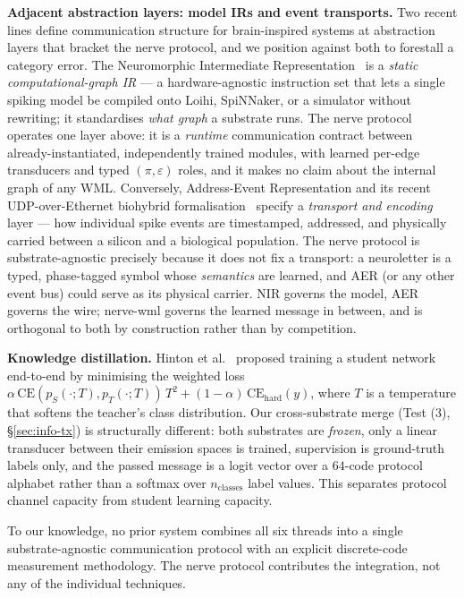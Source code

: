 \documentclass[10pt,twocolumn]{article}
\begin{document}
\textbf{Adjacent abstraction layers: model IRs and event transports.}
Two recent lines define communication structure for brain-inspired
systems at abstraction layers that bracket the nerve protocol, and we
position against both to forestall a category error. The Neuromorphic
Intermediate Representation~\cite{pedersen2024nir} is a
\emph{static computational-graph IR} --- a hardware-agnostic instruction
set that lets a single spiking model be compiled onto Loihi, SpiNNaker,
or a simulator without rewriting; it standardises \emph{what graph} a
substrate runs. The nerve protocol operates one layer above: it is a
\emph{runtime} communication contract between already-instantiated,
independently trained modules, with learned per-edge transducers and
typed $(\pi, \varepsilon)$ roles, and it makes no claim about the
internal graph of any WML. Conversely, Address-Event Representation and
its recent UDP-over-Ethernet biohybrid formalisation~\cite{aer2025biohybrid}
specify a \emph{transport and encoding} layer --- how individual spike
events are timestamped, addressed, and physically carried between a
silicon and a biological population. The nerve protocol is
substrate-agnostic precisely because it does not fix a transport: a
neuroletter is a typed, phase-tagged symbol whose \emph{semantics} are
learned, and AER (or any other event bus) could serve as its physical
carrier. NIR governs the model, AER governs the wire; nerve-wml
governs the learned message in between, and is orthogonal to both by
construction rather than by competition.

\textbf{Knowledge distillation.} Hinton et al.~\cite{hinton2015distilling} proposed training a student network end-to-end by minimising the weighted loss $\alpha\,\mathrm{CE}(p_S(\cdot; T), p_T(\cdot; T))\,T^2 + (1-\alpha)\,\mathrm{CE}_{\mathrm{hard}}(y)$, where $T$ is a temperature that softens the teacher's class distribution. Our cross-substrate merge (Test (3), \S\ref{sec:info-tx}) is structurally different: both substrates are \emph{frozen}, only a linear transducer between their emission spaces is trained, supervision is ground-truth labels only, and the passed message is a logit vector over a $64$-code protocol alphabet rather than a softmax over $n_{\mathrm{classes}}$ label values. This separates protocol channel capacity from student learning capacity.

To our knowledge, no prior system combines all six threads into a single substrate-agnostic communication protocol with an explicit discrete-code measurement methodology. The nerve protocol contributes the integration, not any of the individual techniques.
\end{document}

